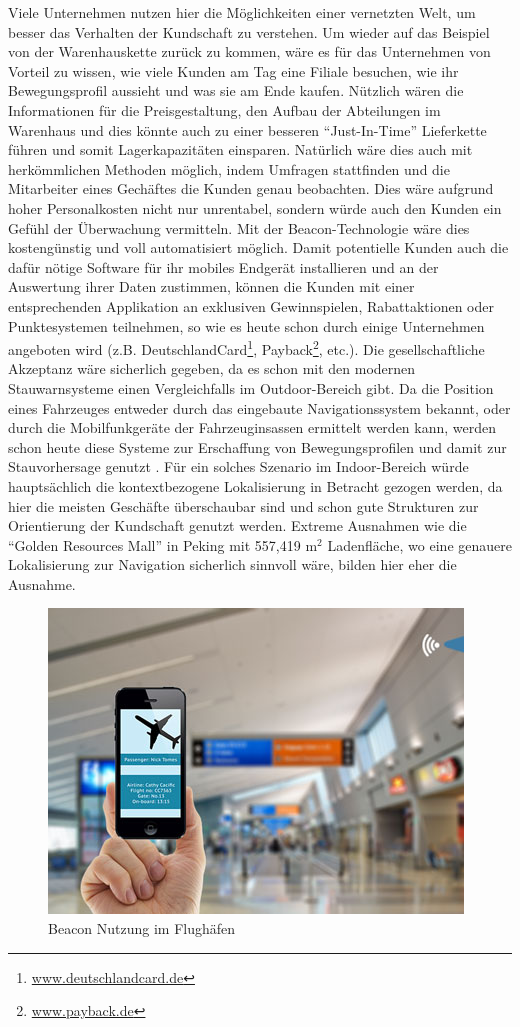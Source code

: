 Viele Unternehmen nutzen hier die Möglichkeiten einer vernetzten Welt, um besser das Verhalten der Kundschaft zu verstehen. Um wieder auf das Beispiel von der Warenhauskette zurück zu kommen, wäre es für das Unternehmen von Vorteil zu wissen, wie viele Kunden am Tag eine Filiale besuchen, wie ihr Bewegungsprofil aussieht und was sie am Ende kaufen. Nützlich wären die Informationen für die Preisgestaltung, den Aufbau der Abteilungen im Warenhaus und dies könnte auch zu einer besseren "`Just-In-Time"' Lieferkette führen und somit Lagerkapazitäten einsparen. Natürlich wäre dies auch mit herkömmlichen Methoden möglich, indem Umfragen stattfinden und die Mitarbeiter eines Gechäftes die Kunden genau beobachten. Dies wäre aufgrund hoher Personalkosten nicht nur unrentabel, sondern würde auch den Kunden ein Gefühl der Überwachung vermitteln. Mit der Beacon-Technologie wäre dies kostengünstig und voll automatisiert möglich. Damit potentielle Kunden auch die dafür nötige Software für ihr mobiles Endgerät installieren und an der Auswertung ihrer Daten zustimmen, können die Kunden mit einer entsprechenden Applikation an exklusiven Gewinnspielen, Rabattaktionen oder Punktesystemen teilnehmen, so wie es heute schon durch einige Unternehmen angeboten wird (z.B. DeutschlandCard\footnote{\url{www.deutschlandcard.de}}, Payback\footnote{\url{www.payback.de}}, etc.). Die gesellschaftliche Akzeptanz wäre sicherlich gegeben, da es schon mit den modernen Stauwarnsysteme einen Vergleichfalls im Outdoor-Bereich gibt. Da die Position eines Fahrzeuges entweder durch das eingebaute Navigationssystem bekannt, oder durch die Mobilfunkgeräte der Fahrzeuginsassen ermittelt werden kann, werden schon heute diese Systeme zur Erschaffung von Bewegungsprofilen und damit zur Stauvorhersage genutzt \cite{Stau}. Für ein solches Szenario im Indoor-Bereich würde hauptsächlich die kontextbezogene Lokalisierung in Betracht gezogen werden, da hier die meisten Geschäfte überschaubar sind und schon gute Strukturen zur Orientierung der Kundschaft genutzt werden. Extreme Ausnahmen wie die "`Golden Resources Mall"' in Peking mit 557,419 $\text{m}^2$ Ladenfläche, wo eine genauere Lokalisierung zur Navigation sicherlich sinnvoll wäre, bilden hier eher die Ausnahme. \par\bigskip
\newpage
\begin{figure} 
\centering
\includegraphics[scale=0.5]{Bilder/iBeaconAirport}
\caption{Beacon Nutzung im Flughäfen \cite{Airpo}}
\label{Airpo}
\end{figure}
